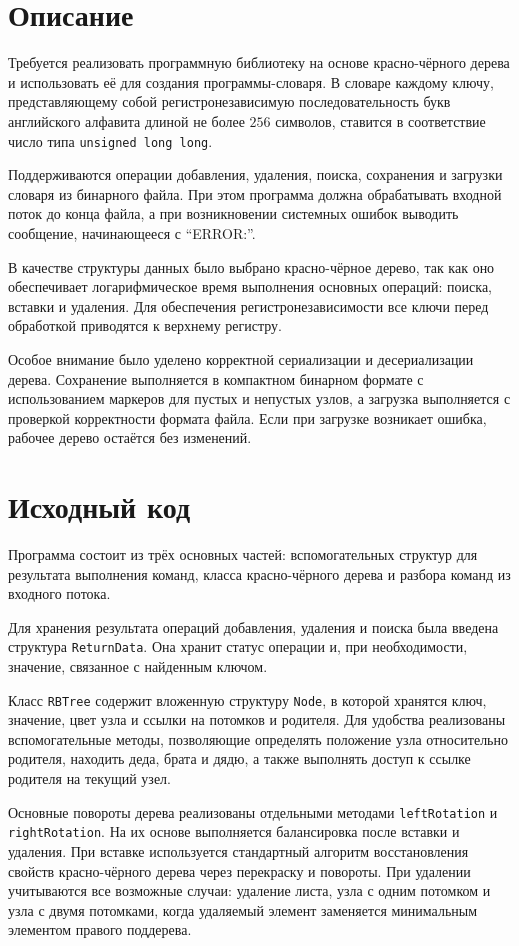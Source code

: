 \section{Описание}
Требуется реализовать программную библиотеку на основе красно-чёрного дерева и использовать её для создания программы-словаря. В словаре каждому ключу, представляющему собой регистронезависимую последовательность букв английского алфавита длиной не более $256$ символов, ставится в соответствие число типа \texttt{unsigned long long}.

Поддерживаются операции добавления, удаления, поиска, сохранения и загрузки словаря из бинарного файла. При этом программа должна обрабатывать входной поток до конца файла, а при возникновении системных ошибок выводить сообщение, начинающееся с \enquote{ERROR:}.

В качестве структуры данных было выбрано красно-чёрное дерево, так как оно обеспечивает логарифмическое время выполнения основных операций: поиска, вставки и удаления. Для обеспечения регистронезависимости все ключи перед обработкой приводятся к верхнему регистру.

Особое внимание было уделено корректной сериализации и десериализации дерева. Сохранение выполняется в компактном бинарном формате с использованием маркеров для пустых и непустых узлов, а загрузка выполняется с проверкой корректности формата файла. Если при загрузке возникает ошибка, рабочее дерево остаётся без изменений.

\pagebreak

\section{Исходный код}
Программа состоит из трёх основных частей: вспомогательных структур для результата выполнения команд, класса красно-чёрного дерева и разбора команд из входного потока.

Для хранения результата операций добавления, удаления и поиска была введена структура \texttt{ReturnData}. Она хранит статус операции и, при необходимости, значение, связанное с найденным ключом.

Класс \texttt{RBTree} содержит вложенную структуру \texttt{Node}, в которой хранятся ключ, значение, цвет узла и ссылки на потомков и родителя. Для удобства реализованы вспомогательные методы, позволяющие определять положение узла относительно родителя, находить деда, брата и дядю, а также выполнять доступ к ссылке родителя на текущий узел.

Основные повороты дерева реализованы отдельными методами \texttt{leftRotation} и \texttt{rightRotation}. На их основе выполняется балансировка после вставки и удаления. При вставке используется стандартный алгоритм восстановления свойств красно-чёрного дерева через перекраску и повороты. При удалении учитываются все возможные случаи: удаление листа, узла с одним потомком и узла с двумя потомками, когда удаляемый элемент заменяется минимальным элементом правого поддерева.

